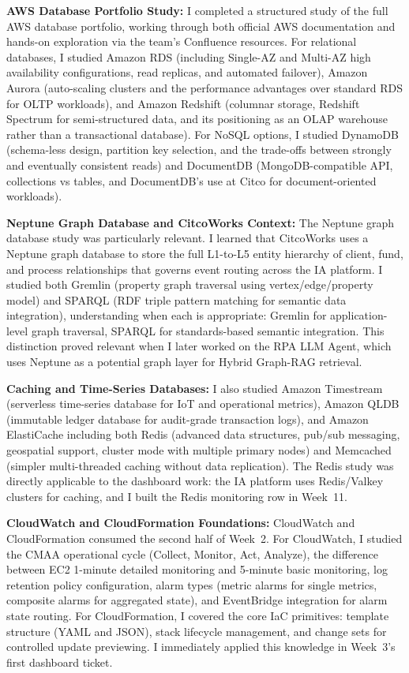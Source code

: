 \textbf{AWS Database Portfolio Study:}
I completed a structured study of the full AWS database portfolio, working through both official AWS documentation and hands-on exploration via the team's Confluence resources. For relational databases, I studied Amazon RDS (including Single-AZ and Multi-AZ high availability configurations, read replicas, and automated failover), Amazon Aurora (auto-scaling clusters and the performance advantages over standard RDS for OLTP workloads), and Amazon Redshift (columnar storage, Redshift Spectrum for semi-structured data, and its positioning as an OLAP warehouse rather than a transactional database). For NoSQL options, I studied DynamoDB (schema-less design, partition key selection, and the trade-offs between strongly and eventually consistent reads) and DocumentDB (MongoDB-compatible API, collections vs tables, and DocumentDB's use at Citco for document-oriented workloads).

\textbf{Neptune Graph Database and CitcoWorks Context:}
The Neptune graph database study was particularly relevant. I learned that CitcoWorks uses a Neptune graph database to store the full L1-to-L5 entity hierarchy of client, fund, and process relationships that governs event routing across the IA platform. I studied both Gremlin (property graph traversal using vertex/edge/property model) and SPARQL (RDF triple pattern matching for semantic data integration), understanding when each is appropriate: Gremlin for application-level graph traversal, SPARQL for standards-based semantic integration. This distinction proved relevant when I later worked on the RPA LLM Agent, which uses Neptune as a potential graph layer for Hybrid Graph-RAG retrieval.

\textbf{Caching and Time-Series Databases:}
I also studied Amazon Timestream (serverless time-series database for IoT and operational metrics), Amazon QLDB (immutable ledger database for audit-grade transaction logs), and Amazon ElastiCache including both Redis (advanced data structures, pub/sub messaging, geospatial support, cluster mode with multiple primary nodes) and Memcached (simpler multi-threaded caching without data replication). The Redis study was directly applicable to the dashboard work: the IA platform uses Redis/Valkey clusters for caching, and I built the Redis monitoring row in Week~11.

\textbf{CloudWatch and CloudFormation Foundations:}
CloudWatch and CloudFormation consumed the second half of Week~2. For CloudWatch, I studied the CMAA operational cycle (Collect, Monitor, Act, Analyze), the difference between EC2 1-minute detailed monitoring and 5-minute basic monitoring, log retention policy configuration, alarm types (metric alarms for single metrics, composite alarms for aggregated state), and EventBridge integration for alarm state routing. For CloudFormation, I covered the core IaC primitives: template structure (YAML and JSON), stack lifecycle management, and change sets for controlled update previewing. I immediately applied this knowledge in Week~3's first dashboard ticket.

